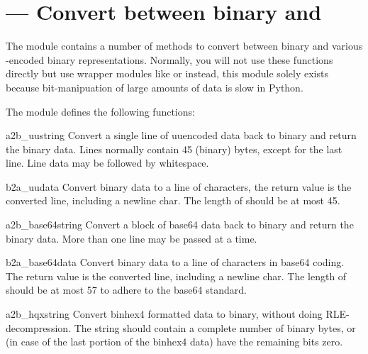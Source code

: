 \section{ ---
         Convert between binary and \ASCII{}}



The  module contains a number of methods to convert
between binary and various \ASCII{}-encoded binary
representations. Normally, you will not use these functions directly
but use wrapper modules like  or
 instead, this module solely
exists because bit-manipuation of large amounts of data is slow in
Python.

The  module defines the following functions:

\begin{funcdesc}{a2b_uu}{string}
Convert a single line of uuencoded data back to binary and return the
binary data. Lines normally contain 45 (binary) bytes, except for the
last line. Line data may be followed by whitespace.
\end{funcdesc}

\begin{funcdesc}{b2a_uu}{data}
Convert binary data to a line of \ASCII{} characters, the return value
is the converted line, including a newline char. The length of
 should be at most 45.
\end{funcdesc}

\begin{funcdesc}{a2b_base64}{string}
Convert a block of base64 data back to binary and return the
binary data. More than one line may be passed at a time.
\end{funcdesc}

\begin{funcdesc}{b2a_base64}{data}
Convert binary data to a line of \ASCII{} characters in base64 coding.
The return value is the converted line, including a newline char.
The length of  should be at most 57 to adhere to the base64
standard.
\end{funcdesc}

\begin{funcdesc}{a2b_hqx}{string}
Convert binhex4 formatted \ASCII{} data to binary, without doing
RLE-decompression. The string should contain a complete number of
binary bytes, or (in case of the last portion of the binhex4 data)
have the remaining bits zero.
\end{funcdesc}

